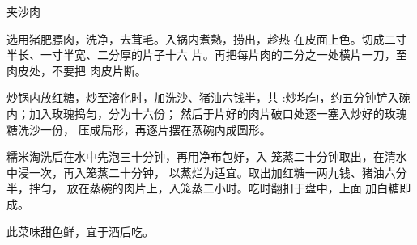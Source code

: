 \begin{recipe}{夹沙肉}

\ingredients


\cooking

\step 	选用猪肥膘肉，洗净，去茸毛。入锅内煮熟，捞出，趁热 在皮面上色。切成二寸半长、一寸半宽、二分厚的片子十六 片。再把每片肉的二分之一处横片一刀，至肉皮处，不要把 肉皮片断。

\step 	炒锅内放红糖，炒至溶化时，加洗沙、猪油六钱半，共 :炒均匀，约五分钟铲入碗内；加入玫瑰捣匀，分为十六份； 然后于片好的肉片破口处逐一塞入炒好的玫瑰糖洗沙一份， 压成扁形，再逐片摆在蒸碗内成圆形。

\step 	糯米淘洗后在水中先泡三十分钟，再用净布包好，入 笼蒸二十分钟取出，在清水中浸一次，再入笼蒸二十分钟， 以蒸烂为适宜。取出加红糖一两九钱、猪油六分半，拌匀， 放在蒸碗的肉片上，入笼蒸二小时。吃时翻扣于盘中，上面 加白糖即成。

\notes

此菜味甜色鲜，宜于酒后吃。

\end{recipe}

